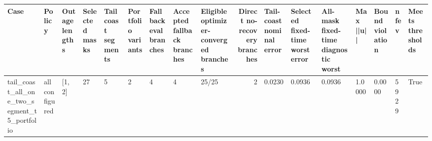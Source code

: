 \begin{tabular}{lllllllllrlllllll}
\toprule
Case & Policy & Outage lengths & Selected masks & Tail coast segments & Portfolio variants & Fallback eval branches & Accepted fallback branches & Eligible optimizer-converged branches & Direct no-recovery branches & Tail-coast nominal error & Selected fixed-time worst error & All-mask fixed-time diagnostic worst & Max ||u|| & Bound violation & nfev & Meets thresholds \\
\midrule
tail\_coast\_all\_one\_two\_segment\_t5\_portfolio & all configured & [1, 2] & 27 & 5 & 2 & 4 & 4 & 25/25 & 2 & 0.0230 & 0.0936 & 0.0936 & 1.0000 & 0.0000 & 5929 & True \\
\bottomrule
\end{tabular}
